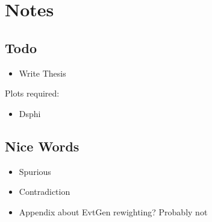 \chapter*{Notes}

\section{Todo}
\begin{itemize}
  \item Write Thesis
\end{itemize}

Plots required:
\begin{itemize}
  \item Dsphi
\end{itemize}

\section{Nice Words}
\begin{itemize}
  \item Spurious
  \item Contradiction
\end{itemize}

\begin{itemize}
  \item Appendix about EvtGen rewighting?  Probably not
\end{itemize}
